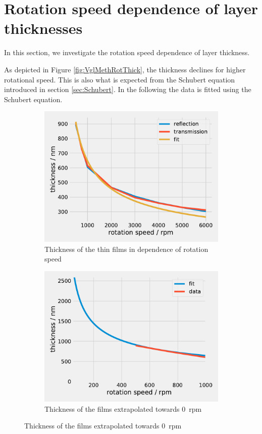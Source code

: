 \section{Rotation speed dependence of layer thicknesses}
\label{sec:rot}

In this section, we investigate the rotation speed dependence of layer thickness.


As depicted in Figure \ref{fig:VglMethRotThick}, the thickness declines for higher rotational speed. This is also what is expected from
the Schubert equation introduced in section \ref{sec:Schubert}. In the following the data is fitted using the Schubert equation.

\begin{figure}[ht]
    \centering
    \begin{subfigure}[b]{0.49\textwidth}
        \centering
        \includegraphics[width = \textwidth]{Programmien/RotFit500to6000.pdf}
        \caption{Thickness of the thin films in dependence of rotation speed}
    \end{subfigure}  
    \begin{subfigure}[b]{0.49\textwidth}
        \centering
        \includegraphics[width = \textwidth]{Programmien/RotFit0to1000.pdf}
        \caption{Thickness of the films extrapolated towards \SI{0}{rpm}}
    \end{subfigure}  


\end{figure}
